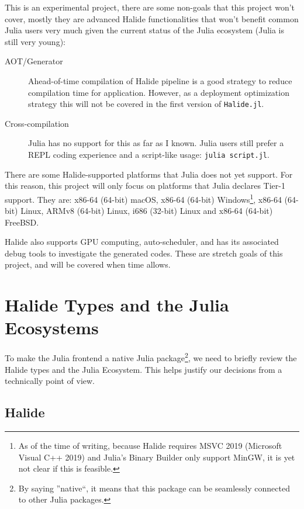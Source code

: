 \documentclass{article}
\begin{document}
This is an experimental project, there are some non-goals that this project won't cover, mostly they are advanced Halide functionalities that won't benefit common Julia users very much given the current status of the Julia ecosystem (Julia is still very young):

\begin{description}
    \item[AOT/Generator] Ahead-of-time compilation of Halide pipeline is a good strategy to reduce compilation time for application. However, as a deployment optimization strategy this will not be covered in the first version of \lstinline{Halide.jl}.
    \item[Cross-compilation] Julia has no support for this as far as I known. Julia users still prefer a REPL coding experience and a script-like usage: \lstinline{julia script.jl}.
\end{description}

There are some Halide-supported platforms that Julia does not yet support\cite{julia_platform}. For this reason, this project will only focus on platforms that Julia declares Tier-1 support. They are: x86-64 (64-bit) macOS, x86-64 (64-bit) Windows\footnote{As of the time of writing, because Halide requires MSVC 2019 (Microsoft Visual C++ 2019) and Julia's Binary Builder only support MinGW, it is yet not clear if this is feasible.}, x86-64 (64-bit) Linux, ARMv8 (64-bit) Linux, i686 (32-bit) Linux and x86-64 (64-bit) FreeBSD.

Halide also supports GPU computing, auto-scheduler, and has its associated debug tools to investigate the generated codes. These are stretch goals of this project, and will be covered when time allows.


\section{Halide Types and the Julia Ecosystems}
\label{sec:halide_julia}

To make the Julia frontend a native Julia package\footnote{By saying ''native``, it means that this package can be seamlessly connected to other Julia packages.}, we need to briefly review the Halide types and the Julia Ecosystem. This helps justify our decisions from a technically point of view.

\subsection{Halide}
\end{document}
